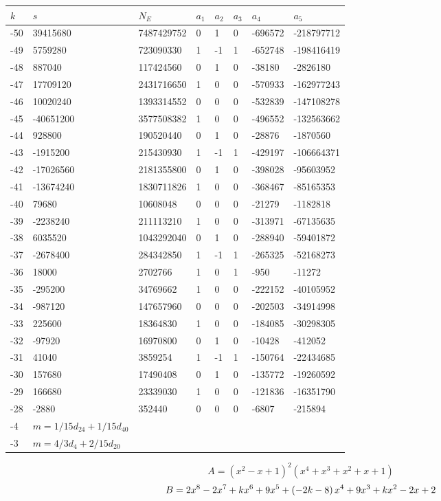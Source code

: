 \documentclass{amsart}
\begin{document}
\begin{longtable}{|l|l|l|lllll|}
\hline
$k$ & $s$ & $N_E$ & $a_1$ & $a_2$ & $a_3$ & $a_4$ & $a_5$\\
\hline
-50&39415680&7487429752&0&1&0&-696572&-218797712\\
-49&5759280&723090330&1&-1&1&-652748&-198416419\\
-48&887040&117424560&0&1&0&-38180&-2826180\\
-47&17709120&2431716650&1&0&0&-570933&-162977243\\
-46&10020240&1393314552&0&0&0&-532839&-147108278\\
-45&-40651200&3577508382&1&0&0&-496552&-132563662\\
-44&928800&190520440&0&1&0&-28876&-1870560\\
-43&-1915200&215430930&1&-1&1&-429197&-106664371\\
-42&-17026560&2181355800&0&1&0&-398028&-95603952\\
-41&-13674240&1830711826&1&0&0&-368467&-85165353\\
-40&79680&10608048&0&0&0&-21279&-1182818\\
-39&-2238240&211113210&1&0&0&-313971&-67135635\\
-38&6035520&1043292040&0&1&0&-288940&-59401872\\
-37&-2678400&284342850&1&-1&1&-265325&-52168273\\
-36&18000&2702766&1&0&1&-950&-11272\\
-35&-295200&34769662&1&0&0&-222152&-40105952\\
-34&-987120&147657960&0&0&0&-202503&-34914998\\
-33&225600&18364830&1&0&0&-184085&-30298305\\
-32&-97920&16970800&0&1&0&-10428&-412052\\
-31&41040&3859254&1&-1&1&-150764&-22434685\\
-30&157680&17490408&0&1&0&-135772&-19260592\\
-29&166680&23339030&1&0&0&-121836&-16351790\\
-28&-2880&352440&0&0&0&-6807&-215894\\
-4&$m=1/15d_{24}+1/15d_{40}$&&\multicolumn{5}{c|}{}\\
-3&$m=4/3d_{4}+2/15d_{20}$&&\multicolumn{5}{c|}{}\\
\hline
\end{longtable}
$$A=(x^2
 - x
 + 1)^{2}(x^4
 + x^3
 + x^2
 + x
 + 1)$$
$$B=2\*x^8
 - 2\*x^7
 + k\*x^6
 + 9\*x^5
 + \left(-2\*k
 - 8\right) \*x^4
 + 9\*x^3
 + k\*x^2
 - 2\*x
 + 2$$
\end{document}
